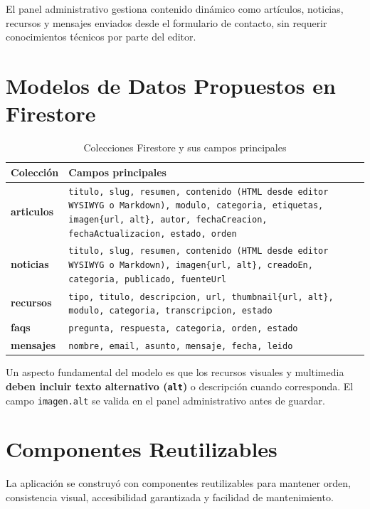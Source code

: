 \documentclass[12pt, a4paper]{article}
\begin{document}
El panel administrativo gestiona contenido dinámico como artículos, noticias, recursos y mensajes enviados desde el formulario de contacto, sin requerir conocimientos técnicos por parte del editor.

\section{Modelos de Datos Propuestos en Firestore}

\begin{table}[H]
\centering
\caption{Colecciones Firestore y sus campos principales}
\small
\begin{tabular}{@{}>{\bfseries\ttfamily}p{2.5cm} p{11.5cm}@{}}
\toprule
\rowcolor{royalblue!12}
\textbf{Colección} & \textbf{Campos principales} \\
\midrule
articulos &
  \texttt{titulo, slug, resumen, contenido (HTML desde editor WYSIWYG o Markdown), modulo, categoria, etiquetas, imagen\{url, alt\}, autor, fechaCreacion, fechaActualizacion, estado, orden} \\
noticias &
  \texttt{titulo, slug, resumen, contenido (HTML desde editor WYSIWYG o Markdown), imagen\{url, alt\}, creadoEn, categoria, publicado, fuenteUrl} \\
recursos &
  \texttt{tipo, titulo, descripcion, url, thumbnail\{url, alt\}, modulo, categoria, transcripcion, estado} \\
faqs &
  \texttt{pregunta, respuesta, categoria, orden, estado} \\
mensajes &
  \texttt{nombre, email, asunto, mensaje, fecha, leido} \\
\bottomrule
\end{tabular}
\end{table}

Un aspecto fundamental del modelo es que los recursos visuales y multimedia \textbf{deben incluir texto alternativo (\texttt{alt})} o descripción cuando corresponda. El campo \texttt{imagen.alt} se valida en el panel administrativo antes de guardar.

\section{Componentes Reutilizables}

La aplicación se construyó con componentes reutilizables para mantener orden, consistencia visual, accesibilidad garantizada y facilidad de mantenimiento.
\end{document}
